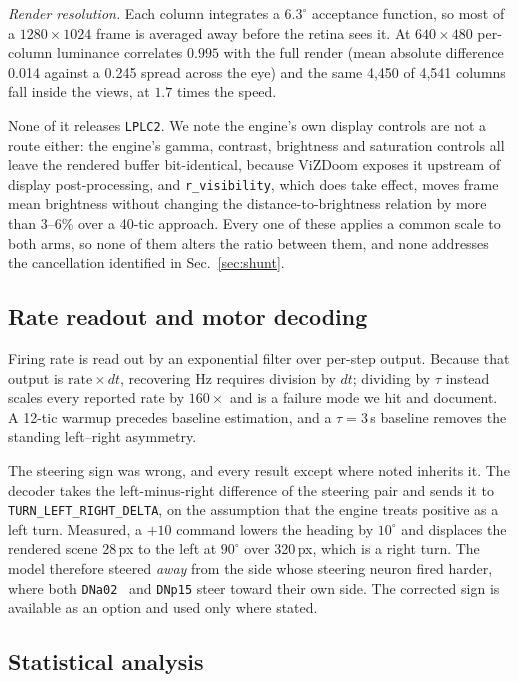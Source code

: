 \documentclass[10pt,twoside]{article}
\newcommand{\cell}[1]{\texttt{#1}}
\begin{document}
\emph{Render resolution.} Each column integrates a $6.3^\circ$ acceptance
function, so most of a $1280\times1024$ frame is averaged away before the
retina sees it. At $640\times480$ per-column luminance correlates $0.995$ with
the full render (mean absolute difference 0.014 against a 0.245 spread across
the eye) and the same 4,450 of 4,541 columns fall inside the views, at $1.7$
times the speed.

None of it releases \cell{LPLC2}. We note the engine's own display controls are
not a route either: the engine's gamma, contrast, brightness and saturation
controls all leave the rendered buffer
bit-identical, because ViZDoom exposes it upstream of display post-processing,
and \texttt{r\_visibility}, which does take effect, moves frame mean brightness
without changing the distance-to-brightness relation by more than 3--6\% over a
40-tic approach. Every one of these applies a common scale to both arms, so none of them alters
the ratio between them, and none addresses the cancellation identified in
Sec.~\ref{sec:shunt}.

\subsection{Rate readout and motor decoding}

Firing rate is read out by an exponential filter over per-step output.
Because that output is $\text{rate}\times dt$, recovering Hz requires division
by $dt$; dividing by $\tau$ instead scales every reported rate by $160\times$
and is a failure mode we hit and document. A 12-tic warmup precedes baseline
estimation, and a $\tau=3$\,s baseline removes the standing left--right
asymmetry.

The steering sign was wrong, and every result except where noted inherits it.
The decoder takes the left-minus-right difference of the steering pair and
sends it to \texttt{TURN\_LEFT\_RIGHT\_DELTA}, on the assumption that the
engine treats positive as a left turn. Measured, a $+10$ command lowers the
heading by $10^\circ$ and displaces the rendered scene $28$\,px to the left
at $90^\circ$ over 320\,px, which is a right turn. The model therefore
steered \emph{away} from the side whose steering neuron fired harder, where
both \cell{DNa02}~\citep{rayshubskiy2025} and \cell{DNp15} steer toward
their own side. The corrected sign is available as an option and used only
where stated.

\subsection{Statistical analysis}
\label{sec:stats}
\end{document}
